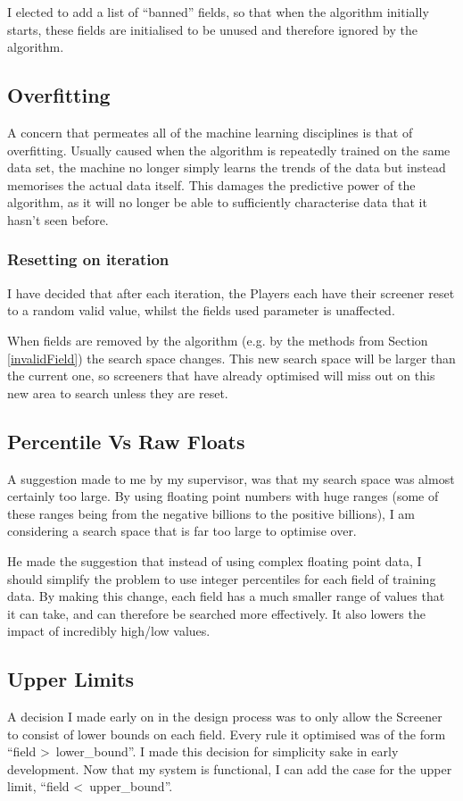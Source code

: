 I elected to add a list of ``banned'' fields, so that when the algorithm initially starts, these fields are initialised to be unused and therefore ignored by the algorithm.

\subsection{Overfitting}
A concern that permeates all of the machine learning disciplines is that of overfitting. Usually caused when the algorithm is repeatedly trained on the same data set, the machine no longer simply learns the trends of the data but instead memorises the actual data itself. This damages the predictive power of the algorithm, as it will no longer be able to sufficiently characterise data that it hasn't seen before.

\subsubsection{Resetting on iteration} \label{iterReset}
I have decided that after each iteration, the Players each have their screener reset to a random valid value, whilst the fields used parameter is unaffected. \newline

When fields are removed by the algorithm (e.g. by the methods from Section \ref{invalidField}) the search space changes. This new search space will be larger than the current one, so screeners that have already optimised will miss out on this new area to search unless they are reset.

\subsection{Percentile Vs Raw Floats}
A suggestion made to me by my supervisor, was that my search space was almost certainly too large. By using floating point numbers with huge ranges (some of these ranges being from the negative billions to the positive billions), I am considering a search space that is far too large to optimise over. \newline

He made the suggestion that instead of using complex floating point data, I should simplify the problem to use integer percentiles for each field of training data. By making this change, each field has a much smaller range of values that it can take, and can therefore be searched more effectively. It also lowers the impact of incredibly high/low values.

\subsection{Upper Limits}
A decision I made early on in the design process was to only allow the Screener to consist of lower bounds on each field. Every rule it optimised was of the form ``field \textgreater \, lower\_bound''. I made this decision for simplicity sake in early development. Now that my system is functional, I can add the case for the upper limit, ``field \textless \, upper\_bound''. \newline